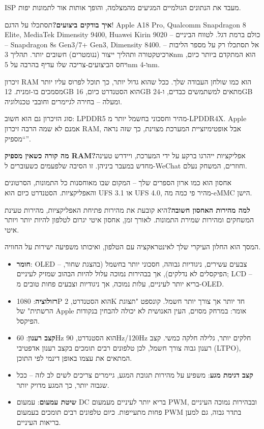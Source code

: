 
ISP מעבד את הנתונים הגולמיים המגיעים מהמצלמה, והופך אותות אור לתמונות יפות.

\textbf{איך בודקים ביצועים?}תסתכלו על הדגם! Apple A18 Pro, Qualcomm Snapdragon 8 Elite, MediaTek Dimensity 9400, Huawei Kirin 9020 – כולם ברמת דגל. לטווח הביניים – Snapdragon 8s Gen3/7+ Gen3, Dimensity 8400. אל תסתכלו רק על מספר הליבות – ארכיטקטורה ותהליך ייצור (ננומטרים) חשובים יותר. תהליך 3nm הוא המתקדם ביותר כיום, ויחס הביצועים-צריכה שלו עדיף בהרבה על 5nm ו-4nm.


זיכרון RAM הוא כמו שולחן העבודה שלך. ככל שהוא גדול יותר, כך תוכל לפרוס עליו יותר מסמכים בו-זמנית. 12GB הוא הסטנדרט כיום, 16GB מתאים למשתמשים כבדים, ו-24GB ומעלה – בחירה לגיימרים וחובבי טכנולוגיה.

סוג הזיכרון גם הוא חשוב: LPDDR5 מהיר וחסכוני בחשמל יותר מ-LPDDR4X. Apple אמנם לא שמה הרבה זיכרון RAM, אבל אופטימיזציית המערכת מצוינת, כך שזה נראה “מספיק”.

\textbf{מה קורה כשאין מספיק RAM?}אפליקציות ייהרגו ברקע על ידי המערכת, ויידרש טעינה מחדש במעבר ביניהן. זו הסיבה שלפעמים כשעוברים ל-WeChat וחוזרים, המשחק נעלם.


אחסון הוא כמו ארון הספרים שלך – המקום שבו מאוחסנות כל התמונות, הסרטונים והאפליקציות. הסטנדרט כיום הוא UFS 3.1 או UFS 4.0, מהיר פי כמה מה-eMMC הישן.

\textbf{למה מהירות האחסון חשובה?}היא קובעת את מהירות פתיחת האפליקציות, מהירות טעינת המשחקים ומהירות שמירת התמונות. לאורך זמן, אחסון איטי יגרום לטלפון להיות יותר ויותר איטי.


המסך הוא החלון העיקרי שלך לאינטראקציה עם הטלפון, ואיכותו משפיעה ישירות על החוויה.

\begin{itemize}
  \item \textbf{חומר}: OLED – צבעים עשירים, ניגודיות גבוהה, חסכוני יותר בחשמל (בהצגת שחור, הפיקסלים לא נדלקים), אך בבהירות נמוכה עלול להיות הבהוב שמזיק לעיניים; LCD – בריא יותר לעיניים, עלות נמוכה, אך ניגודיות וצבעים פחות טובים מ-OLED.
  \item \textbf{רזולוציה}: 1080P הוא הסטנדרט, 2K חד יותר אך צורך יותר חשמל. קונספט "תצוגת הרשתית" של Apple אומר: במרחק מסוים, העין האנושית לא יכולה להבחין בנקודות הפיקסל.
  \item \textbf{קצב רענון}: 60Hz הוא הסטנדרט, 90Hz/120Hz חלקים יותר, גלילה חלקה כמשי. קצב רענון גבוה צורך חשמל, לכן טלפונים רבים תומכים בקצב רענון אדפטיבי (LTPO), המתאים את עצמו באופן דינמי לפי התוכן.
  \item \textbf{קצב דגימת מגע}: משפיע על מהירות תגובת המגע, גיימרים צריכים לשים לב לזה – ככל שגבוה יותר, כך המגע מדויק יותר.
  \item \textbf{שיטת עמעום}: עמעום DC בריא יותר לעיניים מעמעום PWM, ובבהירות נמוכה העיניים פחות מתעייפות. כיום טלפונים רבים תומכים בעמעום PWM בתדר גבוה, גם למען בריאות העיניים.
\end{itemize}

